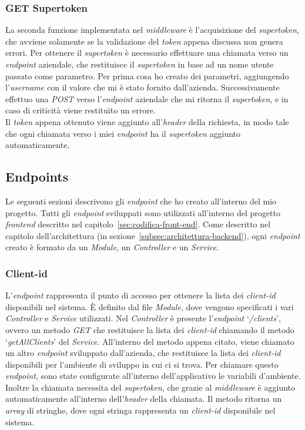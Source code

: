 \subsubsection{GET Supertoken}\label{subsubsec:get-supertoken}
La seconda funzione implementata nel \textit{middleware} è l'acquisizione del \textit{supertoken}, che avviene solamente se la validazione del \textit{token} appena discussa non genera errori.
Per ottenere il \textit{supertoken} è necessario effettuare una chiamata verso un \textit{endpoint} aziendale, che restituisce il \textit{supertoken} in base ad un nome utente passato come parametro.
Per prima cosa ho creato dei parametri, aggiungendo l'\textit{username} con il valore che mi è stato fornito dall'azienda.
Successivamente effettuo una \textit{POST} verso l'\textit{endpoint} aziendale che mi ritorna il \textit{supertoken}, e in caso di criticità viene restituito un errore.\\
Il \textit{token} appena ottenuto viene aggiunto all'\textit{header} della richiesta, in modo tale che ogni chiamata verso i miei \textit{endpoint} ha il \textit{supertoken} aggiunto automaticamente.

\subsection{Endpoints}\label{subsec:endpoints}
Le seguenti sezioni descrivono gli \textit{endpoint} che ho creato all'interno del mio progetto. Tutti gli \textit{endpoint} sviluppati 
sono utilizzati all'interno del progetto \textit{frontend} descritto nel capitolo~\ref{sec:codifica-front-end}.
Come descritto nel capitolo dell'architettura (in sezione~\ref{subsec:architettura-backend}), ogni \textit{endpoint} creato è formato da un \textit{Module}, un \textit{Controller} e un \textit{Service}.

\subsubsection{Client-id}\label{subsubsec:client-id}
L'\textit{endpoint} rappresenta il punto di accesso per ottenere la lista dei \textit{client-id} disponibili nel sistema.
È definito dal file \textit{Module}, dove vengono specificati i vari \textit{Controller} e \textit{Service} utilizzati.
Nel \textit{Controller} è presente l'\textit{endpoint} `\textit{/clients}', ovvero un metodo \textit{GET} che restituisce la lista dei \textit{client-id} chiamando il metodo `\textit{getAllClients}' del \textit{Service}.
All’interno del metodo appena citato, viene chiamato un altro \textit{endpoint} sviluppato dall'azienda, che restituisce 
la lista dei \textit{client-id} disponibili per l'ambiente di sviluppo in cui ci si trova.
Per chiamare questo \textit{endpoint}, sono state configurate all'interno dell'applicativo le variabili d'ambiente.
Inoltre la chiamata necessita del \textit{supertoken}, che grazie al \textit{middleware} è aggiunto automaticamente all'interno 
dell'\textit{header} della chiamata.
Il metodo ritorna un \textit{array} di stringhe, dove ogni stringa rappresenta un \textit{client-id} disponibile nel sistema.

